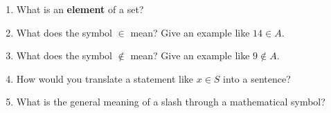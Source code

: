 \begin{enumerate}
  \item What is an \textbf{element} of a set?
  \item What does the symbol $\in$ mean? Give an example like $14 \in A$.
  \item What does the symbol $\notin$ mean? Give an example like $9 \notin A$.
  \item How would you translate a statement like $x \in S$ into a sentence?
  \item What is the general meaning of a slash through a mathematical symbol?
\end{enumerate}

